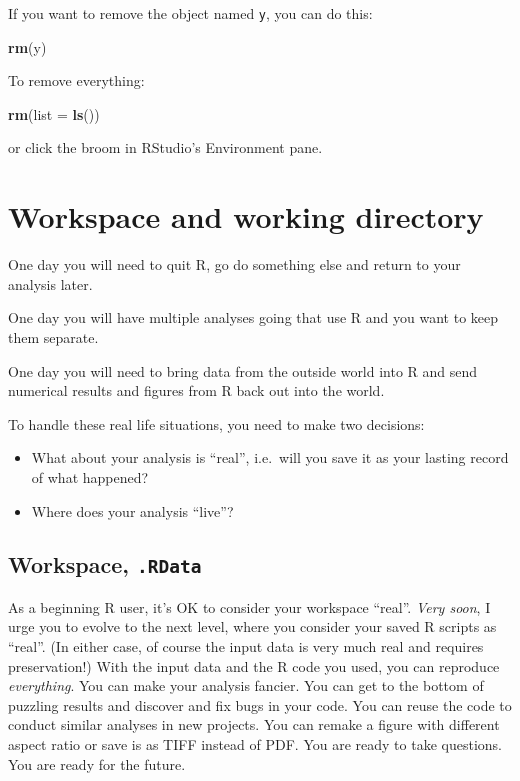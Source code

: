 \documentclass[
]{book}
\newenvironment{Shaded}{\begin{snugshade}}{\end{snugshade}}
\newcommand{\DataTypeTok}[1]{\textcolor[rgb]{0.13,0.29,0.53}{#1}}
\newcommand{\KeywordTok}[1]{\textcolor[rgb]{0.13,0.29,0.53}{\textbf{#1}}}
\newcommand{\NormalTok}[1]{#1}
\providecommand{\tightlist}{%
  \setlength{\itemsep}{0pt}\setlength{\parskip}{0pt}}
\begin{document}
If you want to remove the object named \texttt{y}, you can do this:

\begin{Shaded}
\begin{Highlighting}[]
\KeywordTok{rm}\NormalTok{(y)}
\end{Highlighting}
\end{Shaded}

To remove everything:

\begin{Shaded}
\begin{Highlighting}[]
\KeywordTok{rm}\NormalTok{(}\DataTypeTok{list =} \KeywordTok{ls}\NormalTok{())}
\end{Highlighting}
\end{Shaded}

or click the broom in RStudio's Environment pane.

\hypertarget{workspace-and-working-directory}{%
\section{Workspace and working directory}\label{workspace-and-working-directory}}

One day you will need to quit R, go do something else and return to your analysis later.

One day you will have multiple analyses going that use R and you want to keep them separate.

One day you will need to bring data from the outside world into R and send numerical results and figures from R back out into the world.

To handle these real life situations, you need to make two decisions:

\begin{itemize}
\tightlist
\item
  What about your analysis is ``real'', i.e.~will you save it as your lasting record of what happened?
\item
  Where does your analysis ``live''?
\end{itemize}

\hypertarget{workspace-.rdata}{%
\subsection{\texorpdfstring{Workspace, \texttt{.RData}}{Workspace, .RData}}\label{workspace-.rdata}}

As a beginning R user, it's OK to consider your workspace ``real''. \emph{Very soon}, I urge you to evolve to the next level, where you consider your saved R scripts as ``real''. (In either case, of course the input data is very much real and requires preservation!) With the input data and the R code you used, you can reproduce
\emph{everything}. You can make your analysis fancier. You can get to the bottom of puzzling results and discover and fix bugs in your code. You can reuse the code to conduct similar analyses in new projects. You can remake a figure with different aspect ratio or save is as TIFF instead of PDF. You are ready to take questions. You are ready for the future.
\end{document}
